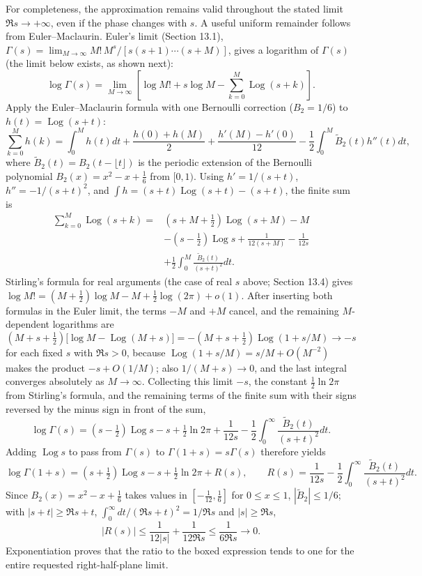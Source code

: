 For completeness, the approximation remains valid throughout the
stated limit $\Re s\to+\infty$, even if the phase changes with $s$.
A useful uniform remainder follows from Euler--Maclaurin. Euler's
limit (Section 13.1),
$\Gamma(s)=\lim_{M\to\infty}M!\,M^s/[s(s+1)\cdots(s+M)]$, gives
a logarithm of $\Gamma(s)$ (the limit below exists, as shown next):
\[
\log\Gamma(s)=\lim_{M\to\infty}
\left[\log M!+s\log M-\sum_{k=0}^M\operatorname{Log}(s+k)\right].
\]
Apply the Euler--Maclaurin formula with one Bernoulli correction
($B_2=1/6$) to $h(t)=\operatorname{Log}(s+t)$:
\[
\sum_{k=0}^Mh(k)=\int_0^Mh(t)dt+\frac{h(0)+h(M)}2
+\frac{h'(M)-h'(0)}{12}
-\frac12\int_0^M\widetilde B_2(t)h''(t)dt,
\]
where $\widetilde B_2(t)=B_2(t-\lfloor t\rfloor)$ is the periodic
extension of the Bernoulli polynomial $B_2(x)=x^2-x+\frac16$ from
$[0,1)$. Using
$h'=1/(s+t)$, $h''=-1/(s+t)^2$, and
$\int h=(s+t)\operatorname{Log}(s+t)-(s+t)$, the finite sum is
\begin{align*}
\sum_{k=0}^M\operatorname{Log}(s+k)
={}&(s+M+\tfrac12)\operatorname{Log}(s+M)-M\\
&-(s-\tfrac12)\operatorname{Log}s
 +\frac1{12(s+M)}-\frac1{12s}\\
&+\frac12\int_0^M\frac{\widetilde B_2(t)}{(s+t)^2}dt.
\end{align*}
Stirling's formula for real arguments (the case of real $s$ above;
Section 13.4) gives
$\log M!=(M+\tfrac12)\log M-M+\tfrac12\log(2\pi)+o(1)$.
After inserting both formulas in the Euler limit, the terms $-M$ and
$+M$ cancel, and the remaining $M$-dependent logarithms are
\[
(M+s+\tfrac12)\bigl[\log M-\operatorname{Log}(M+s)\bigr]
=-(M+s+\tfrac12)\operatorname{Log}(1+s/M)\longrightarrow-s
\]
for each fixed $s$ with $\Re s>0$, because
$\operatorname{Log}(1+s/M)=s/M+O(M^{-2})$ makes the product
$-s+O(1/M)$; also $1/(M+s)\to0$, and the last integral converges
absolutely as $M\to\infty$. Collecting this limit $-s$, the constant
$\frac12\ln2\pi$ from Stirling's formula, and the remaining terms of
the finite sum with their signs reversed by the minus sign in front of
the sum,
\[
\log\Gamma(s)=(s-\tfrac12)\operatorname{Log}s-s+\tfrac12\ln2\pi
+\frac1{12s}-\frac12\int_0^\infty\frac{\widetilde B_2(t)}{(s+t)^2}dt.
\]
Adding $\operatorname{Log}s$ to pass from
$\Gamma(s)$ to $\Gamma(1+s)=s\Gamma(s)$ therefore yields
\[
\log\Gamma(1+s)=(s+\tfrac12)\operatorname{Log}s-s
+\tfrac12\ln2\pi+R(s),\qquad
R(s)=\frac1{12s}-\frac12\int_0^\infty
\frac{\widetilde B_2(t)}{(s+t)^2}dt.
\]
Since $B_2(x)=x^2-x+\frac16$ takes values in $[-\frac1{12},\frac16]$
for $0\le x\le1$, $|\widetilde B_2|\le1/6$; with $|s+t|\ge\Re s+t$,
$\int_0^\infty dt/(\Re s+t)^2=1/\Re s$ and $|s|\ge\Re s$,
\[
|R(s)|\le\frac1{12|s|}+\frac1{12\Re s}
\le\frac1{6\Re s}\longrightarrow0.
\]
Exponentiation proves that the ratio to the boxed expression tends to
one for the entire requested right-half-plane limit.


